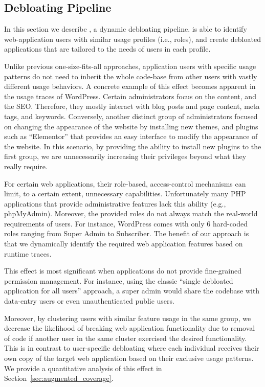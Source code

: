 \subsection{Debloating Pipeline}

In this section we describe \dbltr{}, a dynamic debloating pipeline. 
\dbltr{} is able to identify web-application users with similar usage profiles (i.e., roles), and create debloated applications that are tailored to the needs of users in each profile. 


Unlike previous one-size-fits-all approaches, application users with specific usage patterns do not need to inherit the whole code-base from other users with vastly different usage behaviors. 
A concrete example of this effect becomes apparent in the usage traces of WordPress. 
Certain administrators focus on the content, and the SEO. 
Therefore, they mostly interact with blog posts and page content, meta tags, and keywords. 
Conversely, another distinct group of administrators focused on changing the appearance of the website by installing new themes, and plugins such as ``Elementor'' that provides an easy interface to modify the appearance of the website. 
In this scenario, by providing the ability to install new plugins to the first group, we are unnecessarily increasing their privileges beyond what they really require. 

For certain web applications, their role-based, access-control mechanisms can limit, to a certain extent, unnecessary capabilities.
Unfortunately many PHP applications that provide administrative features lack this ability (e.g., phpMyAdmin). 
Moreover, the provided roles do not always match the real-world requirements of users. For instance, WordPress comes with only 6 hard-coded roles ranging from Super Admin to Subscriber. 
The benefit of our approach is that we dynamically identify the required web application features based on runtime traces. 

This effect is most significant when applications do not provide fine-grained permission management. 
For instance, using the classic ``single debloated application for all users'' approach, a super admin would share the codebase with data-entry users or even unauthenticated public users. 

Moreover, by clustering users with similar feature usage in the same group, we decrease the likelihood of breaking web application functionality due to removal of code if another user in the same cluster exercised the desired functionality. 
This is in contrast to user-specific debloating where each individual receives their own copy of the target web application based on their exclusive usage patterns. 
We provide a quantitative analysis of this effect in Section~\ref{sec:augmented_coverage}.

